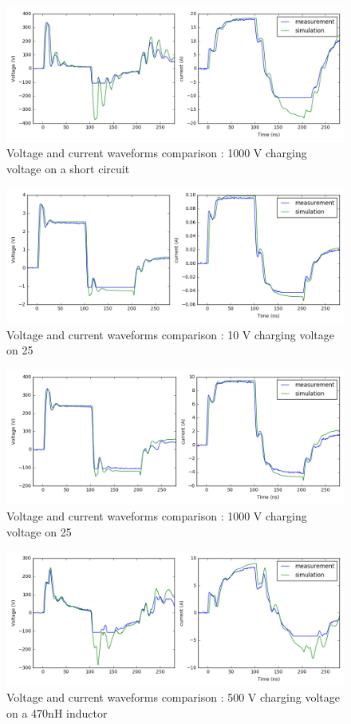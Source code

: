 \begin{figure}[!h]
  \centering
  \includegraphics[width=\textwidth]{src/2/figures/tlp_comparison_short_1000V.png}
  \caption{Voltage and current waveforms comparison : 1000 V charging voltage on a short circuit}
  \label{fig:comparison-tlp-short-1000V}
\end{figure}

\begin{figure}[!h]
  \centering
  \includegraphics[width=\textwidth]{src/2/figures/tlp_comparison_R25_10V.png}
  \caption{Voltage and current waveforms comparison : 10 V charging voltage on 25\textOmega{}}
  \label{fig:comparison-tlp-load-10v}
\end{figure}

\begin{figure}[!h]
  \centering
  \includegraphics[width=\textwidth]{src/2/figures/tlp_comparison_R25_1000V.png}
  \caption{Voltage and current waveforms comparison : 1000 V charging voltage on 25\textOmega{}}
  \label{fig:comparison-tlp-load-1000v}
\end{figure}

\begin{figure}[!h]
  \centering
  \includegraphics[width=\textwidth]{src/2/figures/tlp_comparison_470nH_500V.png}
  \caption{Voltage and current waveforms comparison : 500 V charging voltage on a 470nH inductor}
  \label{fig:comparison-tlp-capa}
\end{figure}
